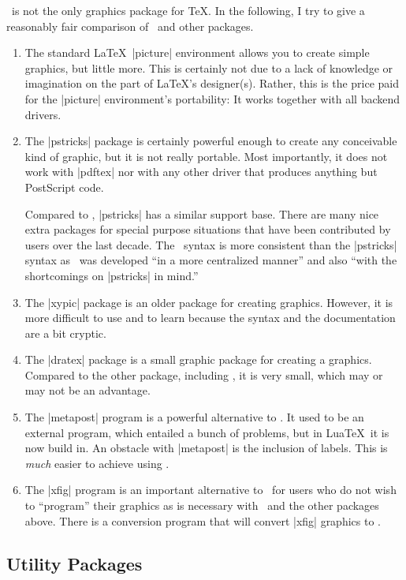 \tikzname\ is not the only graphics package for \TeX. In the following,
I try to give a reasonably fair comparison of \tikzname\ and
other packages.
\begin{enumerate}
\item
  The standard \LaTeX\ |{picture}| environment allows you to create
  simple graphics, but little more. This is certainly not
  due to a lack of knowledge or imagination on the part of
  \LaTeX's designer(s). Rather, this is the price paid for the
  |{picture}| environment's portability: It works together with all
  backend drivers.
\item
  The |pstricks| package is certainly powerful enough to create
  any conceivable kind of graphic, but it is not really portable. Most
  importantly, it does not work with |pdftex| nor with any other
  driver that produces anything but PostScript code.

  Compared to \tikzname, |pstricks| has a similar support base. There
  are many nice extra packages for special purpose situations that have
  been contributed by users over the last decade.
  The \tikzname\ syntax is more consistent than the |pstricks| syntax
  as \tikzname\ was developed ``in a more centralized manner'' and
  also ``with the shortcomings on |pstricks| in mind.''
\item
  The |xypic| package is an older package for creating
  graphics. However, it is more difficult to use and to learn because
  the syntax and the documentation are a bit cryptic.
\item
  The |dratex| package is a small graphic package for creating a
  graphics. Compared to the other package, including \tikzname, it is
  very small, which may or may not be an advantage.
\item
  The |metapost| program is a powerful alternative to
  \tikzname. It used to be an external program, which entailed a
  bunch of problems, but in Lua\TeX\ it is now build in. An obstacle
  with |metapost| is the inclusion of labels. This is \emph{much}
  easier to achieve using \pgfname. 
\item
  The |xfig| program is an important alternative to \tikzname\ for
  users who do not wish to ``program'' their graphics as is necessary
  with \tikzname\ and the other packages above. There is a conversion
  program that will convert |xfig| graphics to \tikzname.
\end{enumerate}


\subsection{Utility Packages}

